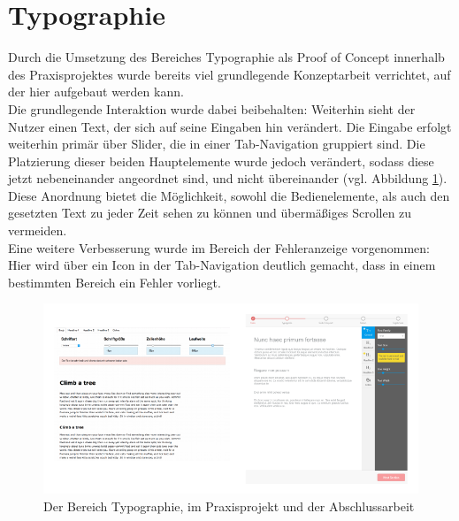 
\section{Typographie}
Durch die Umsetzung des Bereiches Typographie als Proof of Concept innerhalb des Praxisprojektes wurde bereits viel grundlegende Konzeptarbeit verrichtet, auf der hier aufgebaut werden kann.\\
Die grundlegende Interaktion wurde dabei beibehalten: Weiterhin sieht der Nutzer einen Text, der sich auf seine Eingaben hin verändert. Die Eingabe erfolgt weiterhin primär über Slider, die in einer Tab-Navigation gruppiert sind. Die Platzierung dieser beiden Hauptelemente wurde jedoch verändert, sodass diese jetzt nebeneinander angeordnet sind, und nicht übereinander (vgl. Abbildung \ref{fig:vgl_poc_ba}). Diese Anordnung bietet die Möglichkeit, sowohl die Bedienelemente, als auch den gesetzten Text zu jeder Zeit sehen zu können und übermäßiges Scrollen zu vermeiden.\\
Eine weitere Verbesserung wurde im Bereich der Fehleranzeige vorgenommen: Hier wird über ein Icon in der Tab-Navigation deutlich gemacht, dass in einem bestimmten Bereich ein Fehler vorliegt.

\begin{figure}[h]
    \centering
    \includegraphics[width=1\textwidth]{images/vergleich_PoC_BA.png}
    \caption{Der Bereich Typographie, im Praxisprojekt und der Abschlussarbeit}
    \label{fig:vgl_poc_ba}
\end{figure}

